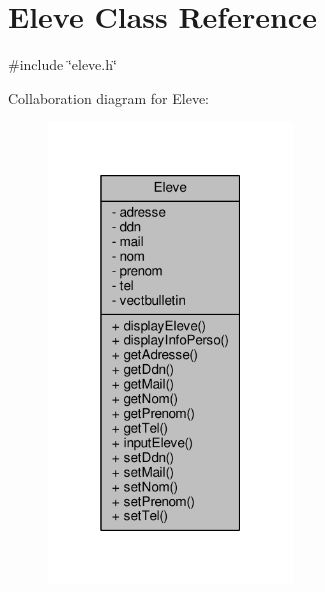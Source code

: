 \hypertarget{classEleve}{\section{Eleve Class Reference}
\label{classEleve}
}


{\ttfamily \#include \char`\"{}eleve.\+h\char`\"{}}



Collaboration diagram for Eleve\+:
\nopagebreak
\begin{figure}[H]
\begin{center}
\leavevmode
\includegraphics[width=184pt]{classEleve__coll__graph}
\end{center}
\end{figure}
